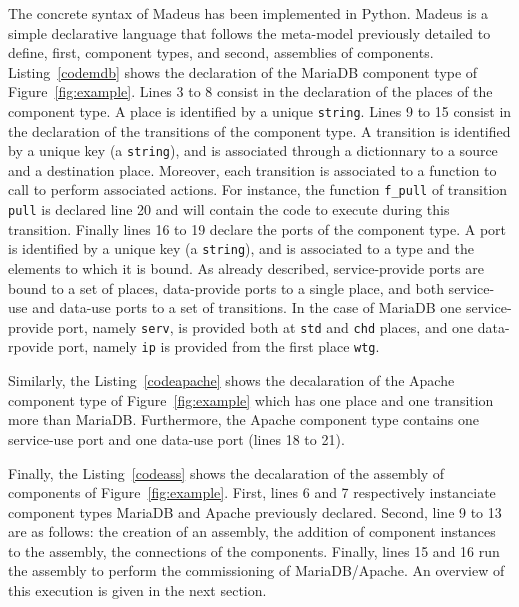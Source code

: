 The concrete syntax of Madeus has been implemented in Python. Madeus
is a simple declarative language that follows the meta-model
previously detailed to define, first, component types, and second,
assemblies of components. Listing~\ref{codemdb} shows the declaration
of the MariaDB component type of Figure~\ref{fig:example}. Lines 3 to
8 consist in the declaration of the places of the component type. A
place is identified by a unique \texttt{string}. Lines 9 to 15 consist
in the declaration of the transitions of the component type. A
transition is identified by a unique key (a \texttt{string}), and is
associated through a dictionnary to a source and a destination
place. Moreover, each transition is associated to a function to call
to perform associated actions. For instance, the function
\texttt{f\_pull} of transition \texttt{pull} is declared line 20 and
will contain the code to execute during this transition. Finally lines
16 to 19 declare the ports of the component type. A port is identified
by a unique key (a \texttt{string}), and is associated to a type and
the elements to which it is bound. As already described,
service-provide ports are bound to a set of places, data-provide ports
to a single place, and both service-use and data-use ports to a set of
transitions. In the case of MariaDB one service-provide port, namely
\texttt{serv}, is provided both at \texttt{std} and \texttt{chd}
places, and one data-rpovide port, namely \texttt{ip} is provided from
the first place \texttt{wtg}.



Similarly, the Listing~\ref{codeapache} shows the decalaration of the
Apache component type of Figure~\ref{fig:example} which has one place
and one transition more than MariaDB. Furthermore, the Apache
component type contains one service-use port and one data-use port
(lines 18 to 21).



Finally, the Listing~\ref{codeass} shows the decalaration of the
assembly of components of Figure~\ref{fig:example}. First, lines 6 and
7 respectively instanciate component types MariaDB and Apache
previously declared. Second, line 9 to 13 are as follows: the creation
of an assembly, the addition of component instances to the assembly,
the connections of the components. Finally, lines 15 and 16 run the
assembly to perform the commissioning of MariaDB/Apache. An overview
of this execution is given in the next section.



